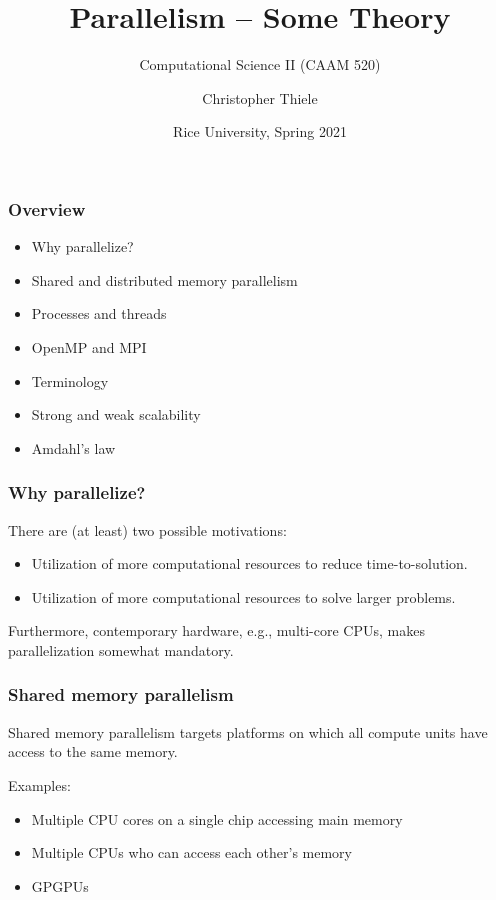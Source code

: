 \documentclass[12pt,t]{beamer}
\begin{document}
  \title{Parallelism -- Some Theory}
  \subtitle{Computational Science II (CAAM 520)}
  \author{Christopher Thiele}
  \date{Rice University, Spring 2021}

  \begin{frame}
    \titlepage
  \end{frame}


  \begin{frame}[fragile]
    \frametitle{Overview}

    \begin{itemize}
      \item Why parallelize?
      \item Shared and distributed memory parallelism
      \item Processes and threads
      \item OpenMP and MPI
      \item Terminology
      \item Strong and weak scalability
      \item Amdahl's law
    \end{itemize}
  \end{frame}

  \begin{frame}[fragile]
    \frametitle{Why parallelize?}

    There are (at least) two possible motivations:
    \begin{itemize}
      \item Utilization of more computational resources to reduce time-to-solution.
      \item Utilization of more computational resources to solve larger problems.
    \end{itemize}

    Furthermore, contemporary hardware, e.g., multi-core CPUs, makes parallelization somewhat mandatory.
  \end{frame}

  \begin{frame}[fragile]
    \frametitle{Shared memory parallelism}

    Shared memory parallelism targets platforms on which all compute units have access to the same memory.

    Examples:
    \begin{itemize}
      \item Multiple CPU cores on a single chip accessing main memory
      \item Multiple CPUs who can access each other's memory
      \item GPGPUs
    \end{itemize}
  \end{frame}
\end{document}
